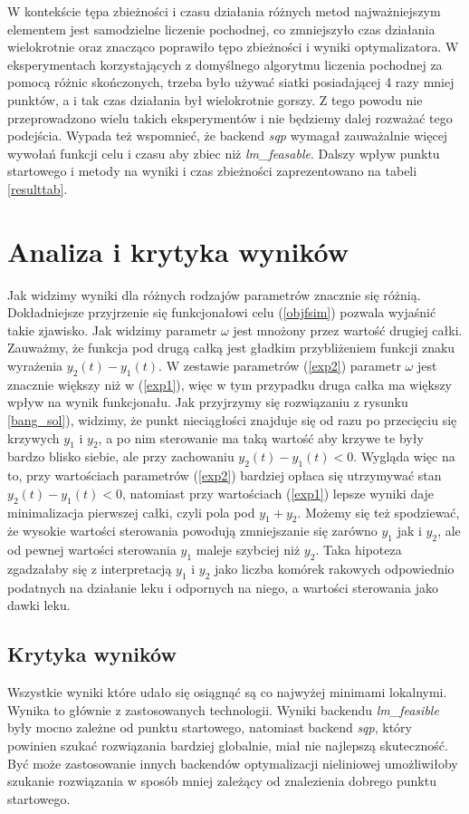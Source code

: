 \documentclass[11pt]{article}
\begin{document}
W kontekście tępa zbieżności i czasu działania różnych metod najważniejszym elementem jest samodzielne liczenie pochodnej, co zmniejszyło czas działania wielokrotnie oraz znacząco poprawiło tępo zbieżności i wyniki optymalizatora. W eksperymentach korzystających z domyślnego algorytmu liczenia pochodnej za pomocą różnic skończonych, trzeba było używać siatki posiadającej 4 razy mniej punktów, a i tak czas działania był wielokrotnie gorszy. Z tego powodu nie przeprowadzono wielu takich eksperymentów i nie będziemy dalej rozważać tego podejścia. Wypada też wspomnieć, że backend {\it sqp\/} wymagał zauważalnie więcej wywołań funkcji celu i czasu aby zbiec niż {\it lm\_feasable}. Dalszy wpływ punktu startowego i metody na wyniki i czas zbieżności zaprezentowano na tabeli \ref{resulttab}.
  
\section{Analiza i krytyka wyników}

Jak widzimy wyniki dla różnych rodzajów parametrów znacznie się różnią. Dokładniejsze przyjrzenie się funkcjonałowi celu (\ref{objfsim}) pozwala wyjaśnić takie zjawisko. Jak widzimy parametr $\omega$ jest mnożony przez wartość drugiej całki. Zauważmy, że funkcja pod drugą całką jest gładkim przybliżeniem funkcji znaku wyrażenia $y_2(t) - y_1(t)$. W zestawie parametrów (\ref{exp2}) parametr $\omega$ jest znacznie większy niż w (\ref{exp1}), więc w tym przypadku druga całka ma większy wpływ na wynik funkcjonału. Jak przyjrzymy się rozwiązaniu z rysunku \ref{bang_sol}), widzimy, że punkt nieciągłości znajduje się od razu po przecięciu się krzywych $y_1$ i $y_2$, a po nim sterowanie ma taką wartość aby krzywe te były bardzo blisko siebie, ale przy zachowaniu $y_2(t) - y_1(t) < 0$. Wygląda więc na to, przy wartościach parametrów (\ref{exp2}) bardziej opłaca się utrzymywać stan $y_2(t) - y_1(t) < 0$, natomiast przy wartościach (\ref{exp1}) lepsze wyniki daje minimalizacja pierwszej całki, czyli pola pod $y_1 + y_2$. Możemy się też spodziewać, że wysokie wartości sterowania powodują zmniejszanie się zarówno $y_1$ jak i $y_2$, ale od pewnej wartości sterowania $y_1$ maleje szybciej niż $y_2$. Taka hipoteza zgadzałaby się z interpretacją $y_1$ i $y_2$ jako liczba komórek rakowych odpowiednio podatnych na działanie leku i odpornych na niego, a wartości sterowania jako dawki leku.

\subsection{Krytyka wyników}
Wszystkie wyniki które udało się osiągnąć są co najwyżej minimami lokalnymi. Wynika to głównie z zastosowanych technologii. Wyniki backendu {\it lm\_feasible\/} były mocno zależne od punktu startowego, natomiast backend {\it sqp\/}, który powinien szukać rozwiązania bardziej globalnie, miał nie najlepszą skuteczność. Być może zastosowanie innych backendów optymalizacji nieliniowej umożliwiłoby szukanie rozwiązania w sposób mniej zależący od znalezienia dobrego punktu startowego.
\end{document}
